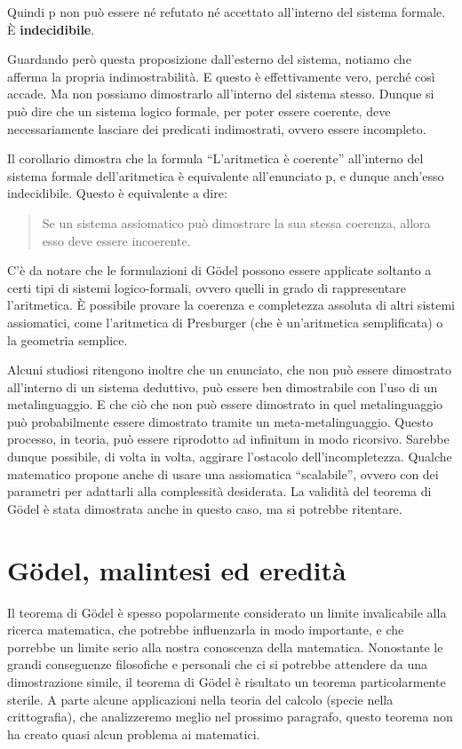 \documentclass[a4paper,10pt]{article}
\begin{document}
Quindi p non può essere né refutato né accettato all'interno del sistema formale. È \textbf{indecidibile}.

Guardando però questa proposizione dall'esterno del sistema, notiamo che afferma la propria indimostrabilità. E questo è effettivamente vero, perché così accade. Ma non possiamo dimostrarlo all'interno del sistema stesso. Dunque si può dire che un sistema logico formale, per poter essere coerente, deve necessariamente lasciare dei predicati indimostrati, ovvero essere incompleto.

Il corollario dimostra che la formula “L'aritmetica è coerente” all'interno del sistema formale dell'aritmetica è equivalente all'enunciato p, e dunque anch'esso indecidibile. Questo è equivalente a dire:

\begin{quote}
Se un sistema assiomatico può dimostrare la sua stessa coerenza, allora esso deve essere incoerente.
\end{quote}

C'è da notare che le formulazioni di Gödel possono essere applicate soltanto a certi tipi di sistemi logico-formali, ovvero quelli in grado di rappresentare l'aritmetica. È possibile provare la coerenza e completezza assoluta di altri sistemi assiomatici, come l'aritmetica di Presburger (che è un'aritmetica semplificata) o la geometria semplice.

Alcuni studiosi ritengono inoltre che un enunciato, che non può essere dimostrato all'interno di un sistema deduttivo, può essere ben dimostrabile con l'uso di un metalinguaggio.
E che ciò che non può essere dimostrato in quel metalinguaggio può probabilmente essere dimostrato tramite un meta-metalinguaggio.
Questo processo, in teoria, può essere riprodotto ad infinitum in modo ricorsivo. Sarebbe dunque possibile, di volta in volta, aggirare l'ostacolo dell'incompletezza.
Qualche matematico propone anche di usare una assiomatica “scalabile”, ovvero con dei parametri per adattarli alla complessità desiderata.
La validità del teorema di Gödel è stata dimostrata anche in questo caso, ma si potrebbe ritentare.

\section{Gödel, malintesi ed eredità}
Il teorema di Gödel è spesso popolarmente considerato un limite invalicabile alla ricerca matematica, che potrebbe influenzarla in modo importante, e che porrebbe un limite serio alla nostra conoscenza della matematica.
Nonostante le grandi conseguenze filosofiche e personali che ci si potrebbe attendere da una dimostrazione simile, il teorema di Gödel è risultato un teorema particolarmente sterile. A parte alcune applicazioni nella teoria del calcolo (specie nella crittografia), che analizzeremo meglio nel prossimo paragrafo, questo teorema non ha creato quasi alcun problema ai matematici.
\end{document}

